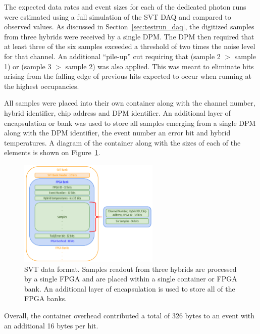 
%
%

The expected data rates and event sizes for each of the dedicated photon runs
were estimated using a full simulation of the SVT DAQ and compared to observed
values. As discussed in Section~\ref{sec:testrun_daq}, the digitized samples
from three hybrids were received by a single DPM.  The DPM then required that
at least three of the six samples exceeded a threshold of two times the noise
level for that channel.  An additional ``pile-up'' cut requiring that 
(sample 2 $>$ sample 1) or (sample 3 $>$ sample 2) was also applied. This was
meant to eliminate hits arising from the falling edge of previous hits expected
to occur when running at the highest occupancies.

All samples were placed into their own container along with the 
channel number, hybrid identifier, chip address and DPM identifier. An 
additional layer of encapsulation or bank was used to store all samples 
emerging from a single DPM along with the DPM identifier, the event number
an error bit and hybrid temperatures. A diagram of the container along with
the sizes of each of the elements is shown on Figure~\ref{fig:data_format}.
\begin{figure}[h]
    \begin{center}
    	\includegraphics[width=0.60\textwidth]{test2012/svtperformance/daq/svt_data_format.pdf}
        \caption{
                    SVT data format. Samples readout from three hybrids are 
                    processed by a single FPGA and are placed within a single
                    container or FPGA bank.  An additional layer of 
                    encapsulation is used to store all of the FPGA banks.
                 } 
	\label{fig:data_format}
    \end{center}
\end{figure}
Overall, the container overhead contributed a total of 326 bytes to an event
with an additional 16 bytes per hit.

